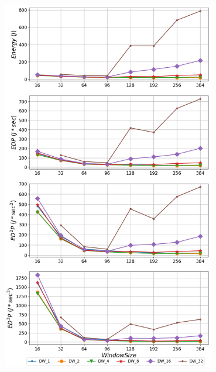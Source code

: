    \begin{minipage}{\textwidth}
      \begin{center}
         \\
         \vspace{3mm}
         \includegraphics[width=0.7\textwidth]{./graphs/edp/mcf.png}
         \vspace{6mm}
      \end{center}
   \end{minipage}


